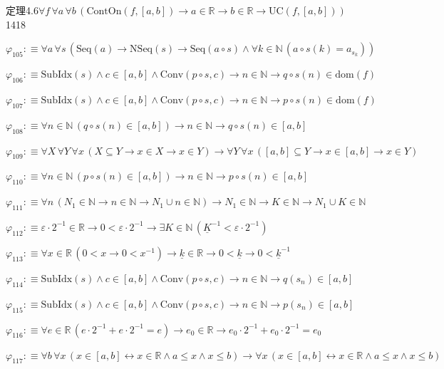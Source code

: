 \begin{fullproof}{定理4.6}{$\forall f\,\forall a\,\forall b\,(\mathrm{ContOn}(f,[a,b]) \to a \in \mathbb{R} \to b \in \mathbb{R} \to \mathrm{UC}(f,[a,b]))$}{1418}
\begin{abbrevlist}
\item $\varphi_{105} :\equiv \forall a\,\forall s\,(\mathrm{Seq}(a) \to \mathrm{NSeq}(s) \to \mathrm{Seq}(a \circ s) \land \forall k \in \mathbb{N}\,(a \circ s(k) = a_{s_{k}}))$
\item $\varphi_{106} :\equiv \mathrm{SubIdx}(s) \land c \in [a,b] \land \mathrm{Conv}(p \circ s,c) \to n \in \mathbb{N} \to q \circ s(n) \in \mathrm{dom}(f)$
\item $\varphi_{107} :\equiv \mathrm{SubIdx}(s) \land c \in [a,b] \land \mathrm{Conv}(p \circ s,c) \to n \in \mathbb{N} \to p \circ s(n) \in \mathrm{dom}(f)$
\item $\varphi_{108} :\equiv \forall n \in \mathbb{N}\,(q \circ s(n) \in [a,b]) \to n \in \mathbb{N} \to q \circ s(n) \in [a,b]$
\item $\varphi_{109} :\equiv \forall X\,\forall Y\,\forall x\,(X \subseteq Y \to x \in X \to x \in Y) \to \forall Y\,\forall x\,([a,b] \subseteq Y \to x \in [a,b] \to x \in Y)$
\item $\varphi_{110} :\equiv \forall n \in \mathbb{N}\,(p \circ s(n) \in [a,b]) \to n \in \mathbb{N} \to p \circ s(n) \in [a,b]$
\item $\varphi_{111} :\equiv \forall n\,(N_{1} \in \mathbb{N} \to n \in \mathbb{N} \to N_{1} \cup n \in \mathbb{N}) \to N_{1} \in \mathbb{N} \to K \in \mathbb{N} \to N_{1} \cup K \in \mathbb{N}$
\item $\varphi_{112} :\equiv \varepsilon \cdot 2^{-1} \in \mathbb{R} \to 0 < \varepsilon \cdot 2^{-1} \to \exists K \in \mathbb{N}\,(\underline{K}^{-1} < \varepsilon \cdot 2^{-1})$
\item $\varphi_{113} :\equiv \forall x \in \mathbb{R}\,(0 < x \to 0 < x^{-1}) \to \underline{k} \in \mathbb{R} \to 0 < \underline{k} \to 0 < \underline{k}^{-1}$
\item $\varphi_{114} :\equiv \mathrm{SubIdx}(s) \land c \in [a,b] \land \mathrm{Conv}(p \circ s,c) \to n \in \mathbb{N} \to q(s_{n}) \in [a,b]$
\item $\varphi_{115} :\equiv \mathrm{SubIdx}(s) \land c \in [a,b] \land \mathrm{Conv}(p \circ s,c) \to n \in \mathbb{N} \to p(s_{n}) \in [a,b]$
\item $\varphi_{116} :\equiv \forall e \in \mathbb{R}\,(e \cdot 2^{-1} + e \cdot 2^{-1} = e) \to e_{0} \in \mathbb{R} \to e_{0} \cdot 2^{-1} + e_{0} \cdot 2^{-1} = e_{0}$
\item $\varphi_{117} :\equiv \forall b\,\forall x\,(x \in [a,b] \leftrightarrow x \in \mathbb{R} \land a \leq x \land x \leq b) \to \forall x\,(x \in [a,b] \leftrightarrow x \in \mathbb{R} \land a \leq x \land x \leq b)$

\end{abbrevlist}
\end{fullproof}
